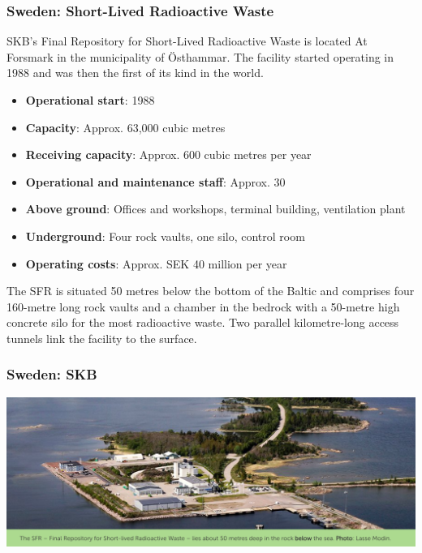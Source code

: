\begin{frame}[c]
\frametitle{Sweden: Short-Lived Radioactive Waste}
SKB’s Final Repository for Short-Lived Radioactive Waste is located
At Forsmark in the municipality of \"{O}sthammar. The facility started operating in 1988 and was then the first of its kind in the world.

\begin{itemize}
\item \textbf{Operational start}: 1988
\item \textbf{Capacity}: Approx. 63,000 cubic metres
\item \textbf{Receiving capacity}: Approx. 600 cubic metres per year
\item \textbf{Operational and maintenance staff}: Approx. 30
\item \textbf{Above ground}: Offices and workshops, terminal building, ventilation plant
\item \textbf{Underground}: Four rock vaults, one silo, control room
\item \textbf{Operating costs}: Approx. SEK 40 million per year
\end{itemize}

The SFR is situated 50 metres below the bottom of the Baltic and comprises four 160-metre long rock vaults and a chamber in the bedrock with a 50-metre high concrete silo for the most radioactive waste. Two parallel kilometre-long access tunnels link the facility to the surface.
\end{frame}
\begin{frame}[c]
\frametitle{Sweden: SKB}

\includegraphics[width=\textwidth]{./images/sweden-sfr}

\end{frame}


